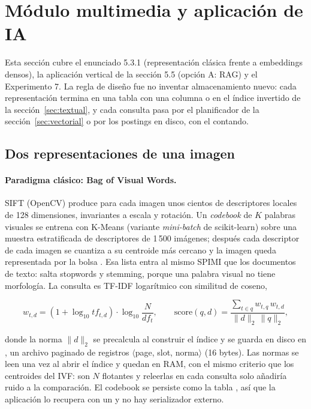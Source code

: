 \section{Módulo multimedia y aplicación de IA}
\label{sec:multimedia}

Esta sección cubre el enunciado 5.3.1 (representación clásica frente a embeddings
densos), la aplicación vertical de la sección 5.5 (opción A: RAG) y el Experimento 7.
La regla de diseño fue no inventar almacenamiento nuevo: cada representación termina
en una tabla  con una columna  o en el índice invertido de
la sección~\ref{sec:textual}, y cada consulta pasa por el planificador de la
sección~\ref{sec:vectorial} o por los postings en disco, con el 
contando.

\subsection{Dos representaciones de una imagen}

\paragraph{Paradigma clásico: Bag of Visual Words.}
SIFT (OpenCV) produce para cada imagen unos cientos de descriptores locales de 128
dimensiones, invariantes a escala y rotación. Un \emph{codebook} de $K$ palabras
visuales se entrena con K-Means (variante \emph{mini-batch} de scikit-learn) sobre una
muestra estratificada de descriptores de 1\,500 imágenes; después cada descriptor de
cada imagen se cuantiza a su centroide más cercano y la imagen queda representada por
la bolsa \code{["vw0012", "vw0012", "vw0377", \ldots]}. Esa lista entra al mismo SPIMI
que los documentos de texto:  salta
stopwords y stemming, porque una palabra visual no tiene morfología. La consulta es
TF-IDF logarítmico con similitud de coseno,

\[
  w_{t,d} = (1+\log_{10} tf_{t,d})\cdot\log_{10}\frac{N}{df_t},\qquad
  \mathrm{score}(q,d)=\frac{\sum_{t\in q} w_{t,q}\,w_{t,d}}{\lVert d\rVert_2\,\lVert q\rVert_2},
\]

donde la norma $\lVert d\rVert_2$ se precalcula al construir el índice y se guarda en
disco en , un archivo paginado de registros
$\langle$page, slot, norma$\rangle$ (16 bytes). Las normas se leen una vez al abrir el
índice y quedan en RAM, con el mismo criterio que los centroides del IVF: son $N$
flotantes y releerlas en cada consulta solo añadiría ruido a la comparación. El
codebook se persiste como la tabla ,
así que la aplicación lo recupera con un  y no hay serializador externo.


